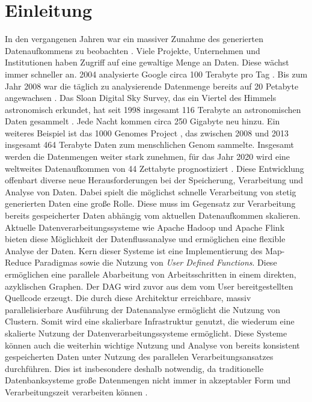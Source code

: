 \chapter{Einleitung}
In den vergangenen Jahren war ein massiver Zunahme des generierten Datenaufkommens zu beobachten \cite{EMC2014}. Viele Projekte, Unternehmen und Institutionen haben Zugriff auf eine gewaltige Menge an Daten. Diese wächst immer schneller an. 2004 analysierte Google circa 100 Terabyte pro Tag \cite{Dean2004}. Bis zum Jahr 2008 war die täglich zu analysierende Datenmenge bereits auf 20 Petabyte angewachsen \cite{Dean2008}. Das Sloan Digital Sky Survey, das ein Viertel des Himmels astronomisch erkundet, hat seit 1998 insgesamt 116 Terabyte an astronomischen Daten gesammelt \cite{York2000, Alam2015}. Jede Nacht kommen circa 250 Gigabyte neu hinzu. Ein weiteres Beispiel ist das 1000 Genomes Project \cite{Baker2010}, das zwischen 2008 und 2013 insgesamt 464 Terabyte Daten zum menschlichen Genom sammelte. Insgesamt werden die Datenmengen weiter stark zunehmen, für das Jahr 2020 wird eine weltweites Datenaufkommen von 44 Zettabyte prognostiziert \cite{EMC2014}. 
Diese Entwicklung offenbart diverse neue Herausforderungen bei der Speicherung, Verarbeitung und Analyse von Daten. Dabei spielt die möglichst schnelle Verarbeitung von stetig generierten Daten eine große Rolle. Diese muss im Gegensatz zur Verarbeitung bereits gespeicherter Daten abhängig vom aktuellen Datenaufkommen skalieren. Aktuelle Datenverarbeitungssysteme wie Apache Hadoop \cite{HadoopWebsite} und Apache Flink \cite{FlinkWebsite} bieten diese Möglichkeit der Datenflussanalyse und ermöglichen eine flexible Analyse der Daten. Kern dieser Systeme ist eine Implementierung des Map-Reduce Paradigmas \cite{Dean2008} sowie die Nutzung von \textit{User Defined Functions}. Diese ermöglichen eine parallele Abarbeitung von Arbeitsschritten in einem direkten, azyklischen Graphen. Der DAG wird zuvor aus dem vom User bereitgestellten Quellcode erzeugt. Die durch diese Architektur erreichbare, massiv parallelisierbare Ausführung der Datenanalyse ermöglicht die Nutzung von Clustern. Somit wird eine skalierbare Infrastruktur genutzt, die wiederum eine skalierte Nutzung der Datenverarbeitungssysteme ermöglicht. Diese Systeme können auch die weiterhin wichtige Nutzung und Analyse von bereits konsistent gespeicherten Daten unter Nutzung des parallelen Verarbeitungsansatzes durchführen. Dies ist insbesondere deshalb notwendig, da traditionelle Datenbanksysteme große Datenmengen nicht immer in akzeptabler Form und Verarbeitungszeit verarbeiten können \cite{Jacobs2009}.
